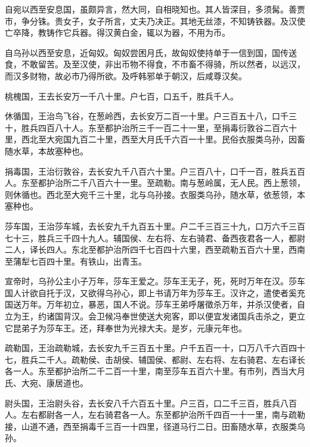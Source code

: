 \documentclass[12pt,UTF8]{ctexbook}
\begin{document}
自宛以西至安息国，虽颇异言，然大同，自相晓知也。其人皆深目，多须髯。善贾市，争分铢。贵女子，女子所言，丈夫乃决正。其地无丝漆，不知铸铁器。及汉使亡卒降，教铸作它兵器。得汉黄白金，辄以为器，不用为币。



自乌孙以西至安息，近匈奴。匈奴尝困月氏，故匈奴使持单于一信到国，国传送食，不敢留苦。及至汉使，非出币物不得食，不市畜不得骑，所以然者，以远汉，而汉多财物，故必市乃得所欲。及呼韩邪单于朝汉，后咸尊汉矣。



桃槐国，王去长安万一千八十里。户七百，口五千，胜兵千人。



休循国，王治鸟飞谷，在葱岭西，去长安万二百一十里。户三百五十八，口千三十，胜兵四百八十人。东至都护治所三千一百二十一里，至捐毒衍敦谷二百六十里，西北至大宛国九百二十里，西至大月氏千六百一十里。民俗衣服类乌孙，因畜随水草，本故塞种也。



捐毒国，王治衍敦谷，去长安九千八百六十里。户三百八十，口千一百，胜兵五百人。东至都护治所二千八百六十一里。至疏勒。南与葱岭属，无人民。西上葱领，则休循也。西北至大宛千三十里，北与乌孙接。衣服类乌孙，随水草，依葱领，本塞种也。



莎车国，王治莎车城，去长安九千九百五十里。户二千三百三十九，口万六千三百七十三，胜兵三千四十九人。辅国侯、左右将、左右骑君、备西夜君各一人，都尉二人，译长四人。东北至都护治所四千七百四十六里，西至疏勒五百六十里，西南至蒲犁七百四十里。有铁山，出青玉。



宣帝时，乌孙公主小子万年，莎车王爱之。莎车王无子，死，死时万年在汉。莎车国人计欲自托于汉，又欲得乌孙心，即上书请万年为莎车王。汉许之，遣使者奚充国送万年。万年初立，暴恶，国人不说。莎车王弟呼屠徵杀万年，并杀汉使者，自立为王，约诸国背汉。会卫候冯奉世使送大宛客，即以便宜发诸国兵击杀之，更立它昆弟子为莎车王。还，拜奉世为光禄大夫。是岁，元康元年也。



疏勒国，王治疏勒城，去长安九千三百五十里。户千五百一十，口万八千六百四十七，胜兵二千人。疏勒侯、击胡侯、辅国侯、都尉、左右将、左右骑君、左右译长各一人。东至都护治所二千二百一十里，南至莎车五百六十里。有市列，西当大月氏、大宛、康居道也。



尉头国，王治尉头谷，去长安八千六百五十里。户三百，口二千三百，胜兵八百人。左右都尉各一人，左右骑君各一人。东至都护治所千四百一十一里，南与疏勒接，山道不通，西至捐毒千三百一十四里，径道马行二日。田畜随水草，衣服类乌孙。
\end{document}
